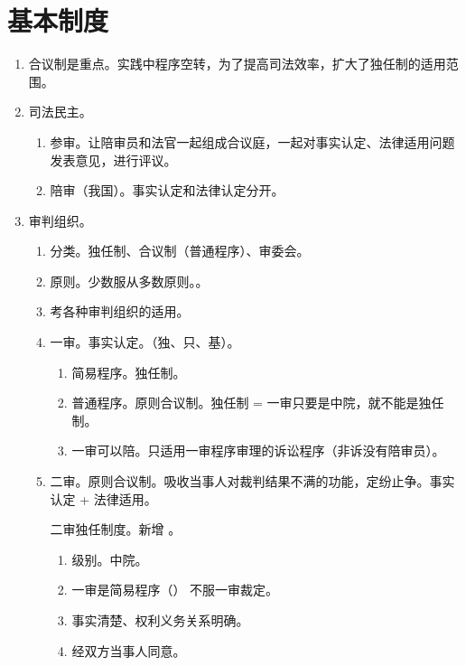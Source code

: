\section{基本制度}
\begin{enumerate}
  \item 合议制是重点。实践中程序空转，为了提高司法效率，扩大了独任制的适用范围。
  \item 司法民主。
        \begin{enumerate}
          \item 参审。让陪审员和法官一起组成合议庭，一起对事实认定、法律适用问题发表意见，进行评议。
          \item 陪审（我国）。事实认定和法律认定分开。
        \end{enumerate}
  \item 审判组织。
        \begin{enumerate}
          \item 分类。独任制、合议制（\bdy 普通程序）、审委会。
          \item 原则。少数服从多数原则。。
          \item 考各种审判组织的适用。
          \item 一审。事实认定。（独、只、基）。
                \begin{enumerate}
                  \item 简易程序。独任制。
                  \item 普通程序。原则合议制。独任制 =  \yjt 一审只要是中院，就不能是独任制。
                  \item 一审可以陪。只适用一审程序审理的诉讼程序（非诉没有陪审员）。
                \end{enumerate}
          \item 二审。原则合议制。吸收当事人对裁判结果不满的功能，定纷止争。事实认定 + 法律适用。
                \begin{kk}{二审独任制度。新增}
                  。
                  \begin{enumerate}
                    \item 级别。中院。
                    \item 一审是简易程序（） \hz 不服一审裁定。
                    \item 事实清楚、权利义务关系明确。
                    \item 经双方当事人同意。

\end{enumerate}
\end{kk}
\end{enumerate}
\end{enumerate}
